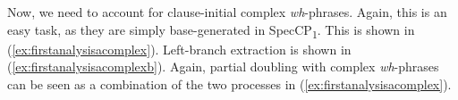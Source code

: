 %
%
%
%

\newpage  
\noindent Now, we need to account for clause-initial complex \textit{wh}-phrases. Again, this is an easy task, as they are simply base-generated in SpecCP\textsubscript{1}. This is shown in (\ref{ex:firstanalysisacomplex}). Left-branch extraction is shown in (\ref{ex:firstanalysisacomplexb}). Again, partial doubling with complex \textit{wh}-phrases can be seen as a combination of the two processes in (\ref{ex:firstanalysisacomplex}).




 


